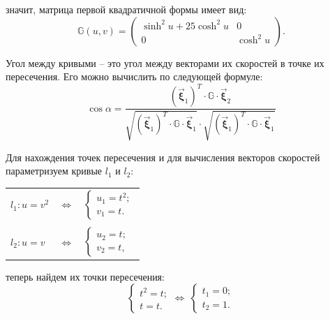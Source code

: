 \documentclass[12pt,a4paper]{article}
\newcommand{\boldVec}[1]{\vec{\mathbf #1}}
\begin{document}
    \noindent значит, матрица первой квадратичной формы имеет вид: 
    \[
       \mathbb{G}(u, v) = 
       \begin{pmatrix}
           \sinh^2 u + 25 \cosh^2 u & 0
           \\
           0                        & \cosh^2 u
       \end{pmatrix}\! .
    \]

    Угол между кривыми -- это угол между векторами их скоростей в точке их пересечения. Его можно вычислить по следующей формуле:
    \[
        \cos \alpha = \frac {
            (\boldVec \xi_1)^T \cdot \mathbb{G} \cdot \boldVec \xi_2
        } {
            \sqrt{(\boldVec \xi_1)^T \cdot \mathbb{G} \cdot \boldVec \xi_1} \cdot \sqrt{(\boldVec \xi_1)^T \cdot \mathbb{G} \cdot \boldVec \xi_1}
        }
    \]
    
    Для нахождения точек пересечения и для вычисления векторов скоростей параметризуем кривые $ l_1 $ и $ l_2 $:
    \begin{table}[h]
        \centering
        \begin{tabular}{lcl}
            $
                l_1: u = v^2
            $ 
            & $ \Leftrightarrow $ & 
            $
                \begin{cases}
                    u_1 = t^2;
                    \\
                    v_1 = t.
                \end{cases}
            $

            \\ \\

            $
                l_2: u = v
            $ 
            & $ \Leftrightarrow $ & 
            $
                \begin{cases}
                    u_2 = t;
                    \\
                    v_2 = t,
                \end{cases}
            $
        \end{tabular}
    \end{table}
    
    \noindent теперь найдем их точки пересечения:
    \[
        \begin{cases}
            t^2 = t;
            \\
            t = t.
        \end{cases}
        \Leftrightarrow \ 
        \begin{cases}
            t_1 = 0;
            \\
            t_2 = 1.
        \end{cases}
    \]
    
\end{document}

